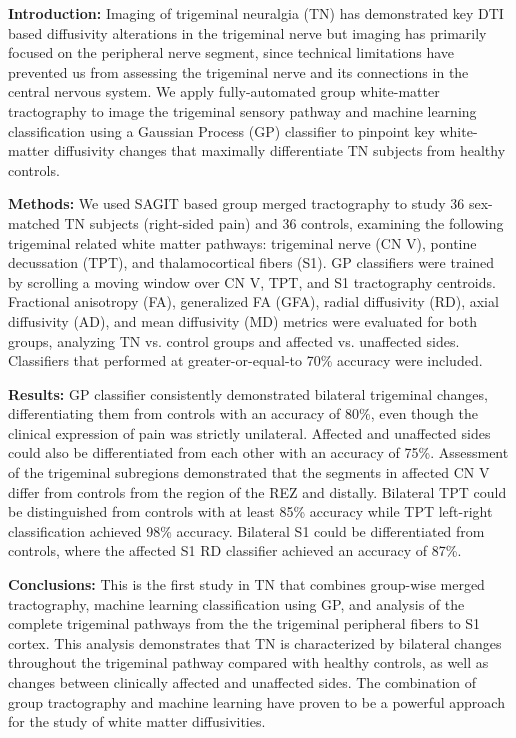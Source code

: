 \textbf{Introduction:}  Imaging of trigeminal neuralgia (TN) has demonstrated key DTI based diffusivity alterations in the trigeminal nerve but imaging has primarily focused on the peripheral nerve segment, since technical limitations have  prevented us from assessing the trigeminal nerve and its connections in the central nervous system. We apply fully-automated group white-matter tractography to image the trigeminal sensory pathway and machine learning classification using a Gaussian Process (GP) classifier to pinpoint key white-matter diffusivity changes that maximally differentiate TN subjects from healthy controls. 

\textbf{Methods:} We used SAGIT based group merged tractography to study 36 sex-matched TN subjects (right-sided pain) and 36 controls, examining the following trigeminal related white matter pathways: trigeminal nerve (CN V), pontine decussation (TPT), and thalamocortical fibers (S1). GP classifiers were trained by scrolling a moving window over CN V, TPT, and S1 tractography centroids. Fractional anisotropy (FA), generalized FA (GFA), radial diffusivity (RD), axial diffusivity (AD), and mean diffusivity (MD) metrics were evaluated for both groups, analyzing TN vs. control groups and affected vs. unaffected sides. Classifiers that performed at greater-or-equal-to 70\% accuracy were included.

\textbf{Results:} GP classifier consistently demonstrated bilateral trigeminal changes, differentiating them from controls with an accuracy of 80\%, even though the clinical expression of pain was strictly unilateral. Affected and unaffected sides could also be differentiated from each other with an accuracy of 75\%. Assessment of the trigeminal subregions demonstrated that the segments in affected CN V differ from controls from the region of the REZ and distally. Bilateral TPT could be distinguished from controls with at least 85\% accuracy while TPT left-right classification achieved 98\% accuracy. Bilateral S1 could be differentiated from controls, where the affected S1 RD classifier achieved an accuracy of 87\%.

\textbf{Conclusions:} This is the first study in TN that combines group-wise merged tractography, machine learning classification using GP, and analysis of the complete trigeminal pathways from the the trigeminal peripheral fibers to S1 cortex. This analysis demonstrates that TN is characterized by bilateral changes throughout the trigeminal pathway compared with healthy controls, as well as changes between clinically affected and unaffected sides. The combination of group tractography and machine learning have proven to be a powerful approach for the study of white matter diffusivities.